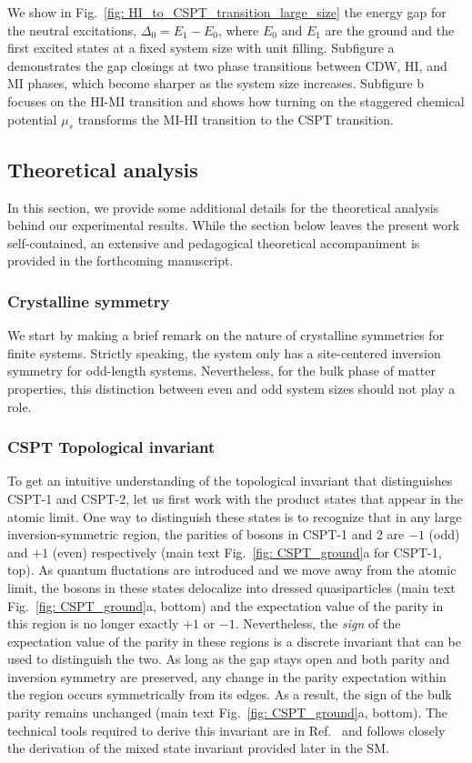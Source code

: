 \documentclass[preprint,superscriptaddress,floatfix, nofootinbib]{revtex4-2}
\begin{document}
We show in Fig.~\ref{fig: HI_to_CSPT_transition_large_size} the energy gap for the neutral excitations, $\Delta_0=E_1-E_0$, where $E_0$ and $E_1$ are the ground and the first excited states at a fixed system size with unit filling. Subfigure a demonstrates the gap closings at two phase transitions between CDW, HI, and MI phases, which become sharper as the system size increases. Subfigure b focuses on the HI-MI transition and shows how turning on the staggered chemical potential $\mu_s$ transforms the MI-HI transition to the CSPT transition. 


\subsection*{Theoretical analysis}

In this section, we provide some additional details for the theoretical analysis behind our experimental results.
%
While the section below leaves the present work self-contained, an extensive and pedagogical theoretical accompaniment is provided in the forthcoming \cite{Sahay2025} manuscript.

\subsubsection*{Crystalline symmetry}
We start by making a brief remark on the nature of crystalline symmetries for finite systems.
%
Strictly speaking, the system only has a site-centered inversion symmetry for odd-length systems.
%
Nevertheless, for the bulk phase of matter properties, this distinction between even and odd system sizes should not play a role.

\subsubsection*{CSPT Topological invariant}

To get an intuitive understanding of the topological invariant that distinguishes CSPT-1 and CSPT-2, let us first work with the product states that appear in the atomic limit.
%
One way to distinguish these states is to recognize that in any large inversion-symmetric region, the parities of bosons in CSPT-1 and 2 are $-1$ (odd) and $+1$ (even) respectively (main text Fig.~\ref{fig: CSPT_ground}a for CSPT-1, top).
%
As quantum fluctations are introduced and we move away from the atomic limit, the bosons in these states delocalize into dressed quasiparticles (main text Fig.~\ref{fig: CSPT_ground}a, bottom) and the expectation value of the parity in this region is no longer exactly $+1$ or $-1$.
%
Nevertheless, the \textit{sign} of the expectation value of the parity in these regions is a discrete invariant that can be used to distinguish the two.
%
As long as the gap stays open and both parity and inversion symmetry are preserved, any change in the parity expectation within the region occurs symmetrically from its edges. As a result, the sign of the bulk parity remains unchanged (main text Fig.~\ref{fig: CSPT_ground}a, bottom).
%
The technical tools required to derive this invariant are in Ref.~\cite{Fuji2015} and follows closely the derivation of the mixed state invariant provided later in the SM.
\end{document}
